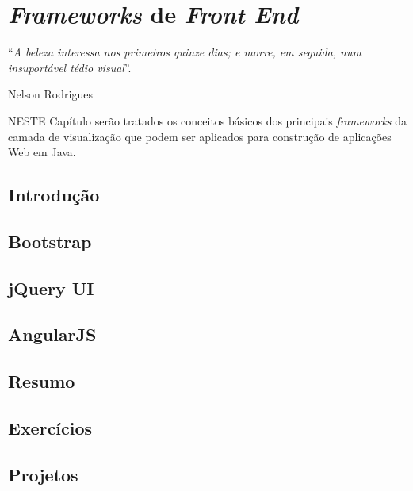 \chapter{\textit{Frameworks} de \textit{Front End}}\label{cap:frameworksFront}
\epigraph{``\textit{A beleza interessa nos primeiros quinze dias; e morre, em seguida, num insuportável tédio visual}''.}{Nelson Rodrigues}

\lettrine[lines=4, lhang=0.1, lraise=0, loversize=0.2, findent=0.1em]{\textcolor{corAzulTema}{N}}{ESTE} Capítulo serão tratados os conceitos básicos dos principais \textit{frameworks} da camada de visualização que podem ser aplicados para construção de aplicações Web em Java.

\section{Introdução}

\section{Bootstrap}

\section{jQuery UI}

\section{AngularJS}

\section{Resumo}

\section{Exercícios}

\section{Projetos}
